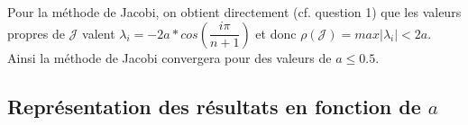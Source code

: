 Pour la méthode de Jacobi, on obtient directement (cf. question 1) que les valeurs propres de $\mathcal{J}$ valent $\lambda _i = -2a * cos(\dfrac{i \pi}{n+1})$ et donc $\rho(\mathcal{J}) = max |\lambda _i| < 2a$. Ainsi la méthode de Jacobi convergera pour des valeurs de $a \leq 0.5$. 

\subsection{Représentation des résultats en fonction de $a$}